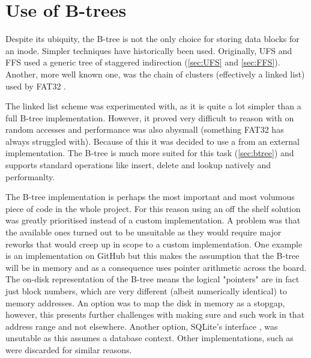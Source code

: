     \section{Use of B-trees}
        \label{sec:design_btree}

        Despite its ubiquity, the B-tree is not the only choice for storing
        data blocks for an inode. Simpler techniques have historically been
        used. Originally, UFS and FFS used a generic tree of staggered
        indirection (\autoref{sec:UFS} and \autoref{sec:FFS}). Another, more well known
        one, was the chain of clusters (effectively a linked list) used by
        FAT32 \cite{fat32}.

        The linked list scheme was experimented with, as it is quite a lot
        simpler than a full B-tree implementation. However, it proved very
        difficult to reason with on random accesses and performance was also
        abysmall (something FAT32 has always struggled with). Because of this
        it was decided to use a \bplustree from an external implementation. The
        B-tree is much more suited for this task (\autoref{sec:btree}) and supports
        standard operations like insert, delete and lookup natively and
        performanlty.

        The B-tree implementation is perhaps the most important and most
        volumous piece of code in the whole project. For this reason using an
        off the shelf solution was greatly prioritised instead of a custom
        implementation. A problem was that the available ones turned out to be
        unsuitable as they would require major reworks that would creep up in
        scope to a custom implementation. One example is an implementation on
        GitHub \cite{GitHub_btree} but this makes the assumption that the
        B-tree will be in memory and as a consequence uses pointer arithmetic
        across the board. The on-disk representation of the B-tree means the
        logical "pointers" are in fact just block numbers, which are very
        different (albeit numerically identical) to memory addresses. An option
        was to map the disk in memory as a stopgap, however, this presents
        further challenges with making sure  and such work in
        that address range and not elsewhere. Another option, SQLite's
        interface \cite{SQLite_btree}, was unsutable as this assumes a database
        context. Other implementations, such as \cite{random_btree} were
        discarded for similar reasons.

